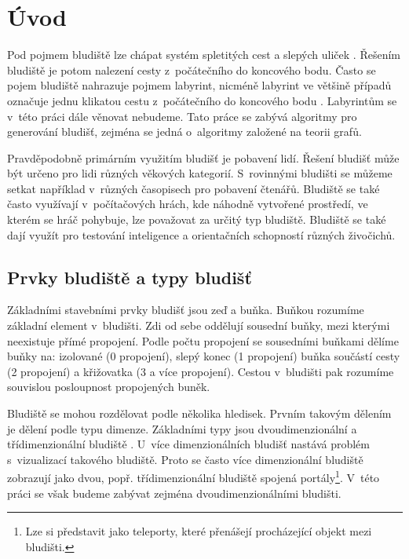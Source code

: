 \documentclass[a4paper,12pt]{article}
\begin{document}


\tableofcontents
\newpage

\section{Úvod}
Pod pojmem bludiště lze chápat systém spletitých cest a slepých uliček \cite{wiki}. Řešením bludiště
je potom nalezení cesty z~počátečního do koncového bodu. Často se pojem bludiště nahrazuje pojmem
labyrint, nicméně labyrint ve většině případů označuje jednu klikatou cestu z~počátečního 
do koncového bodu \cite{ped}. Labyrintům se v~této práci dále věnovat nebudeme. Tato práce se zabývá 
algoritmy pro generování bludišť, zejména se jedná o~algoritmy založené na teorii grafů.

Pravděpodobně primárním využitím bludišť je pobavení lidí. Řešení bludišť může být určeno pro 
lidi různých věkových kategorií. S~rovinnými bludišti se můžeme setkat například v~různých 
časopisech pro pobavení čtenářů. Bludiště se také často využívají v~počítačových hrách, kde
náhodně vytvořené prostředí, ve kterém se hráč pohybuje, lze považovat za určitý typ bludiště.
Bludiště se také dají využít pro testování inteligence a orientačních schopností různých živočichů.

\subsection{Prvky bludiště a typy bludišť}
Základními stavebními prvky bludišť jsou zeď a buňka. Buňkou rozumíme základní element
v~bludišti. Zdi od sebe oddělují sousední buňky, mezi kterými neexistuje přímé propojení.
Podle počtu propojení se sousedními buňkami dělíme buňky na: izolované (0 propojení), slepý konec (1 propojení)
buňka součástí cesty (2 propojení) a křižovatka (3 a více propojení). Cestou v~bludišti pak rozumíme souvislou
posloupnost propojených buněk.

Bludiště se mohou rozdělovat podle několika hledisek. Prvním takovým dělením je dělení podle typu dimenze. 
Základními typy jsou dvoudimenzionální a třídimenzionální bludiště \cite{pul:lab}.
U~více dimenzionálních bludišť nastává problém s~vizualizací takového bludiště. Proto se často 
více dimenzionální bludiště zobrazují jako dvou, popř. třídimenzionální bludiště spojená portály\footnote{Lze si 
představit jako teleporty, které přenášejí procházející objekt mezi bludišti.}.
V~této práci se však budeme zabývat zejména dvoudimenzionálními bludišti. 
\end{document}
